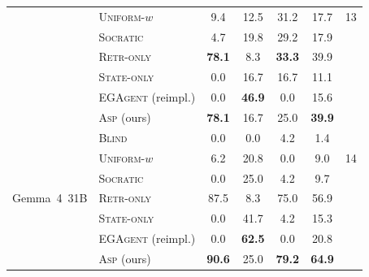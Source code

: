 \documentclass[10pt]{article}
\theoremstyle{definition}
\theoremstyle{plain}
\newcommand{\ASP}{\textsc{Asp}}
\begin{document}
\begin{table}[!htbp]
\begin{tabular}{llcccc@{\hskip 10pt}c}
 & \textsc{Uniform-}$w$ & 9.4 & 12.5 & 31.2 & 17.7 & 13 \\
 & \textsc{Socratic} & 4.7 & 19.8 & 29.2 & 17.9 &  \\
 & \textsc{Retr-only} & \textbf{78.1} & 8.3 & \textbf{33.3} & 39.9 &  \\
 & \textsc{State-only} & 0.0 & 16.7 & 16.7 & 11.1 &  \\
 & \textsc{EGAgent} (reimpl.) & 0.0 & \textbf{46.9} & 0.0 & 15.6 &  \\
 & \ASP{} (ours) & \textbf{78.1} & 16.7 & 25.0 & \textbf{39.9} &  \\
\midrule
\multirow{7}{*}{Gemma~4~31B}
 & \textsc{Blind} & 0.0 & 0.0 & 4.2 & 1.4 &  \\
 & \textsc{Uniform-}$w$ & 6.2 & 20.8 & 0.0 & 9.0 & 14 \\
 & \textsc{Socratic} & 0.0 & 25.0 & 4.2 & 9.7 &  \\
 & \textsc{Retr-only} & 87.5 & 8.3 & 75.0 & 56.9 &  \\
 & \textsc{State-only} & 0.0 & 41.7 & 4.2 & 15.3 &  \\
 & \textsc{EGAgent} (reimpl.) & 0.0 & \textbf{62.5} & 0.0 & 20.8 &  \\
 & \ASP{} (ours) & \textbf{90.6} & 25.0 & \textbf{79.2} & \textbf{64.9} &  \\
\bottomrule
\end{tabular}
\end{table}
\end{document}
